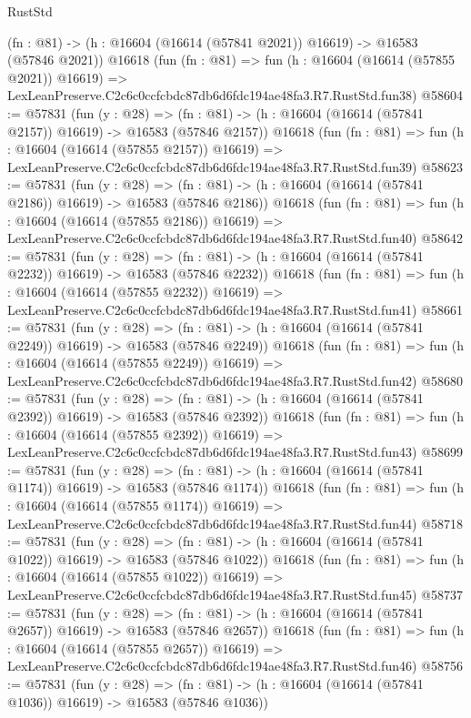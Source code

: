 \begin{lexlean}{RustStd}
\begin{coremodule}
    (fn : @81) -> (h : @16604 (@16614 (@57841 @2021)) @16619) -> @16583 (@57846 @2021))
    @16618
    (fun (fn : @81) =>
    fun (h : @16604 (@16614 (@57855 @2021)) @16619) =>
    LexLeanPreserve.C2c6c0ccfcbdc87db6d6fdc194ae48fa3.R7.RustStd.fun38)
@58604 := @57831
    (fun (y : @28) =>
    (fn : @81) -> (h : @16604 (@16614 (@57841 @2157)) @16619) -> @16583 (@57846 @2157))
    @16618
    (fun (fn : @81) =>
    fun (h : @16604 (@16614 (@57855 @2157)) @16619) =>
    LexLeanPreserve.C2c6c0ccfcbdc87db6d6fdc194ae48fa3.R7.RustStd.fun39)
@58623 := @57831
    (fun (y : @28) =>
    (fn : @81) -> (h : @16604 (@16614 (@57841 @2186)) @16619) -> @16583 (@57846 @2186))
    @16618
    (fun (fn : @81) =>
    fun (h : @16604 (@16614 (@57855 @2186)) @16619) =>
    LexLeanPreserve.C2c6c0ccfcbdc87db6d6fdc194ae48fa3.R7.RustStd.fun40)
@58642 := @57831
    (fun (y : @28) =>
    (fn : @81) -> (h : @16604 (@16614 (@57841 @2232)) @16619) -> @16583 (@57846 @2232))
    @16618
    (fun (fn : @81) =>
    fun (h : @16604 (@16614 (@57855 @2232)) @16619) =>
    LexLeanPreserve.C2c6c0ccfcbdc87db6d6fdc194ae48fa3.R7.RustStd.fun41)
@58661 := @57831
    (fun (y : @28) =>
    (fn : @81) -> (h : @16604 (@16614 (@57841 @2249)) @16619) -> @16583 (@57846 @2249))
    @16618
    (fun (fn : @81) =>
    fun (h : @16604 (@16614 (@57855 @2249)) @16619) =>
    LexLeanPreserve.C2c6c0ccfcbdc87db6d6fdc194ae48fa3.R7.RustStd.fun42)
@58680 := @57831
    (fun (y : @28) =>
    (fn : @81) -> (h : @16604 (@16614 (@57841 @2392)) @16619) -> @16583 (@57846 @2392))
    @16618
    (fun (fn : @81) =>
    fun (h : @16604 (@16614 (@57855 @2392)) @16619) =>
    LexLeanPreserve.C2c6c0ccfcbdc87db6d6fdc194ae48fa3.R7.RustStd.fun43)
@58699 := @57831
    (fun (y : @28) =>
    (fn : @81) -> (h : @16604 (@16614 (@57841 @1174)) @16619) -> @16583 (@57846 @1174))
    @16618
    (fun (fn : @81) =>
    fun (h : @16604 (@16614 (@57855 @1174)) @16619) =>
    LexLeanPreserve.C2c6c0ccfcbdc87db6d6fdc194ae48fa3.R7.RustStd.fun44)
@58718 := @57831
    (fun (y : @28) =>
    (fn : @81) -> (h : @16604 (@16614 (@57841 @1022)) @16619) -> @16583 (@57846 @1022))
    @16618
    (fun (fn : @81) =>
    fun (h : @16604 (@16614 (@57855 @1022)) @16619) =>
    LexLeanPreserve.C2c6c0ccfcbdc87db6d6fdc194ae48fa3.R7.RustStd.fun45)
@58737 := @57831
    (fun (y : @28) =>
    (fn : @81) -> (h : @16604 (@16614 (@57841 @2657)) @16619) -> @16583 (@57846 @2657))
    @16618
    (fun (fn : @81) =>
    fun (h : @16604 (@16614 (@57855 @2657)) @16619) =>
    LexLeanPreserve.C2c6c0ccfcbdc87db6d6fdc194ae48fa3.R7.RustStd.fun46)
@58756 := @57831
    (fun (y : @28) =>
    (fn : @81) -> (h : @16604 (@16614 (@57841 @1036)) @16619) -> @16583 (@57846 @1036))

\end{coremodule}
\end{lexlean}
